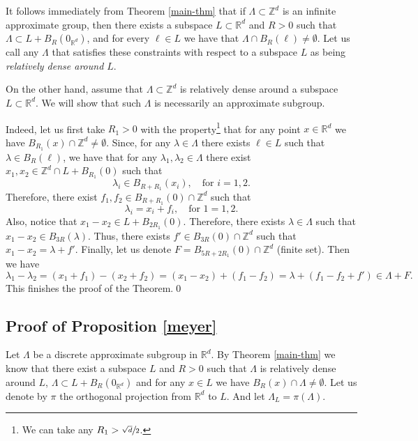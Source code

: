 \documentclass[10pt]{amsart}
\newcommand{\bR}{\mathbb{R}}
\newcommand{\bZ}{\mathbb{Z}}
\theoremstyle{plain}
\theoremstyle{definition}
\begin{document}
It follows immediately from Theorem \ref{main-thm} that if \hbox{$\Lambda \subset \bZ^d$} is an infinite approximate group, then there exists a subspace $L \subset \bR^d$ and $R > 0$ such that $\Lambda \subset L + B_R(0_{\bR^d})$, and for every $\ell \in L$ we have that $\Lambda \cap B_R(\ell) \neq \emptyset$. Let us call any $\Lambda$ that satisfies these constraints with respect to a subspace $L$ as being \textit{relatively dense around $L$}.

On the other hand, assume that $\Lambda \subset \bZ^d$ is relatively dense around a subspace $L \subset \bR^d$. We will show that such $\Lambda$ is necessarily an approximate subgroup.

Indeed, let us first take $R_1 > 0$ with the property\footnote{We can take any $R_1 >\sfrac{\sqrt{d}}{2}$.} that
for any point $x \in \bR^d$ we have $B_{R_1}(x) \cap \bZ^d \neq \emptyset$. Since, for any $\lambda \in \Lambda$ there exists $\ell \in L$ such that $\lambda \in B_R(\ell)$, we have that for any $\lambda_1,\lambda_2 \in \Lambda$ there exist
$x_1,x_2 \in \bZ^d \cap L+B_{R_1}(0)$ such that
\[
\lambda_i \in B_{R+R_1}(x_i), \quad\text{for } i = 1,2.
\]
Therefore, there exist $f_1,f_2 \in B_{R+R_1}(0) \cap \bZ^d$ such that
\[
\lambda_i = x_i + f_i, \quad\text{for } 1 = 1,2.
\]
Also, notice that $x_1 - x_2 \in L + B_{2R_1}(0)$. Therefore, there exists $\lambda \in \Lambda$ such that $x_1 - x_2 \in B_{3R}(\lambda)$. Thus, there exists $f' \in B_{3R}(0) \cap \bZ^{d}$ such that $x_1-x_2 = \lambda + f'$. Finally,
let us denote $F = B_{5R + 2R_1}(0) \cap \bZ^d$ (finite set). Then we have
\[
\lambda_1 - \lambda_2 = (x_1 + f_1) - (x_2 + f_2) = (x_1 - x_2) + (f_1 - f_2) = \lambda + (f_1 - f_2 + f') \in \Lambda + F.
\]
This finishes the proof of the Theorem.\qed

\subsection{Proof of Proposition \ref{meyer}}

Let $\Lambda$ be a discrete approximate subgroup in $\bR^d$. By Theorem \ref{main-thm} we know that there exist a subspace $L$ and $R > 0$ such that $\Lambda$ is relatively dense around $L$, \ie $\Lambda \subset L + B_R(0_{\bR^d})$ and for any $x \in L$ we have $B_R(x) \cap \Lambda \neq \emptyset$. Let us denote by $\pi$ the orthogonal projection from $\bR^d$ to $L$. And let $\Lambda_L = \pi(\Lambda)$.
\end{document}
